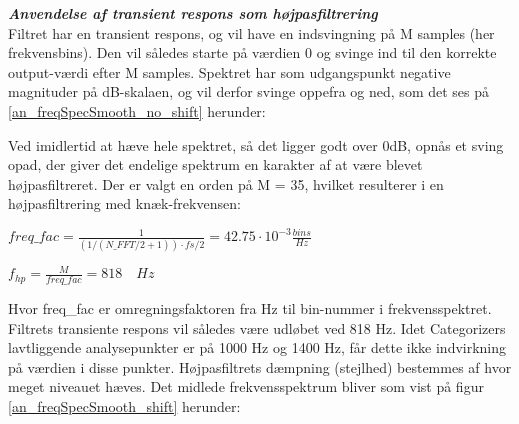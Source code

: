 \textbf{\textit{Anvendelse af transient respons som højpasfiltrering}}\\ \label{intlyd:analyzer:smooth_hp}
Filtret har en transient respons, og vil have en indsvingning på M samples (her frekvensbins). Den vil således starte på værdien 0 og svinge ind til den korrekte output-værdi efter M samples. Spektret har som udgangspunkt negative magnituder på dB-skalaen, og vil derfor svinge oppefra og ned, som det ses på \ref{an_freqSpecSmooth_no_shift} herunder:


Ved imidlertid at hæve hele spektret, så det ligger godt over 0dB, opnås et sving opad, der giver det endelige spektrum en karakter af at være blevet højpasfiltreret. Der er valgt en orden på M = 35, hvilket resulterer i en højpasfiltrering med knæk-frekvensen:
\begin{center}
$ freq\_ fac=\frac { 1 }{ \left( { 1 }/{ { \left( N\_ FFT/2+1 \right)  } } \right) \cdot { fs }/{ 2 } } =42.75\cdot { 10 }^{ -3 }\frac { bins }{ Hz } $
\end{center}
\begin{center}
${ f }_{ hp }=\frac { M }{ freq\_ fac } =818\quad Hz $
\end{center} 

Hvor freq\_fac er omregningsfaktoren fra Hz til bin-nummer i frekvensspektret. Filtrets transiente respons vil således være udløbet ved 818 Hz. Idet Categorizers lavtliggende analysepunkter er på 1000 Hz og 1400 Hz, får dette ikke indvirkning på værdien i disse punkter. Højpasfiltrets dæmpning (stejlhed) bestemmes af hvor meget niveauet hæves. Det midlede frekvensspektrum bliver som vist på figur \ref{an_freqSpecSmooth_shift} herunder:


